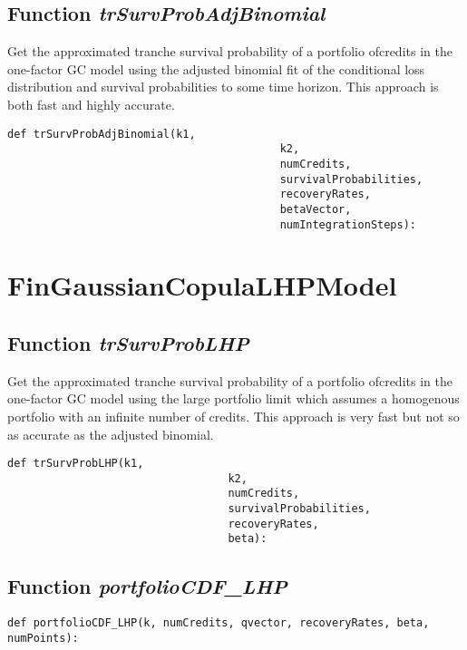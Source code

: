 \documentclass[twoside,11pt]{book}
\begin{document}
\subsection{Function {\it trSurvProbAdjBinomial}}
Get the approximated tranche survival probability of a portfolio ofcredits in the one-factor GC model using the adjusted binomial fit of the conditional loss distribution and survival probabilities to some time horizon. This approach is both fast and highly accurate. 

\begin{lstlisting}
def trSurvProbAdjBinomial(k1, 
                                          k2, 
                                          numCredits,
                                          survivalProbabilities, 
                                          recoveryRates, 
                                          betaVector,
                                          numIntegrationSteps):
\end{lstlisting}

\newpage
\section{FinGaussianCopulaLHPModel}

\subsection{Function {\it trSurvProbLHP}}
Get the approximated tranche survival probability of a portfolio ofcredits in the one-factor GC model using the large portfolio limit which assumes a homogenous portfolio with an infinite number of credits. This approach is very fast but not so as accurate as the adjusted binomial. 

\begin{lstlisting}
def trSurvProbLHP(k1, 
                                  k2, 
                                  numCredits, 
                                  survivalProbabilities, 
                                  recoveryRates, 
                                  beta):
\end{lstlisting}

\subsection{Function {\it portfolioCDF\_LHP}}


\begin{lstlisting}
def portfolioCDF_LHP(k, numCredits, qvector, recoveryRates, beta, numPoints):
\end{lstlisting}
\end{document}

